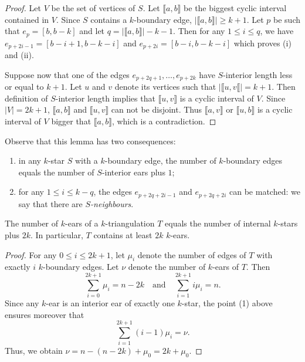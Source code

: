 \documentclass[12pt]{amsart}
\begin{document}
\begin{proof}
Let $V$ be the set of vertices of $S$. Let $\llbracket a,b\rrbracket$ be the biggest cyclic interval contained in $V$. Since $S$ contains a $k$-boundary edge, $|\llbracket a,b\rrbracket|\ge k+1$. Let $p$ be such that $e_p=[b,b-k]$ and let $q=|\llbracket a,b\rrbracket|-k-1$.
Then for any $1\le i\le q$, we have $e_{p+2i-1}=[b-i+1,b-k-i]$ and $e_{p+2i}=[b-i,b-k-i]$ which proves (i) and (ii). 

Suppose now that one of the edges $e_{p+2q+1},\ldots,e_{p+2k}$ have $S$-interior length less or equal to $k+1$. Let $u$ and $v$ denote its vertices such that $|\llbracket u,v\llbracket|=k+1$. Then definition of $S$-interior length implies that $\llbracket u,v\rrbracket$ is a cyclic interval of $V$. Since $|V|=2k+1$, $\llbracket a,b\rrbracket$ and $\llbracket u,v\rrbracket$ can not be disjoint. Thus $\llbracket a,v\rrbracket$ or $\llbracket u,b\rrbracket$ is a cyclic interval of $V$ bigger that $\llbracket a,b\rrbracket$, which is a contradiction.
\end{proof}

Observe that this lemma has two consequences:
\begin{enumerate}
\item in any $k$-star $S$ with a $k$-boundary edge, the number of $k$-boundary edges equals the number of $S$-interior ears plus $1$;
\item for any $1\le i\le k-q$, the edges $e_{p+2q+2i-1}$ and $e_{p+2q+2i}$ can be matched: we say that there are \emph{$S$-neighbours}.
\end{enumerate}

\begin{corollary}\label{earsenumeration}
The number of $k$-ears of a $k$-triangulation $T$ equals the number of internal $k$-stars plus $2k$.
In particular, $T$ contains at least $2k$ $k$-ears.
\end{corollary}

\begin{proof}
For any $0\le i\le 2k+1$, let $\mu_i$ denote the number of edges of $T$ with exactly $i$ $k$-boundary edges. Let $\nu$ denote the number of $k$-ears of $T$. Then
$$\sum_{i=0}^{2k+1} \mu_i=n-2k \quad \mathrm{and}\quad \sum_{i=1}^{2k+1} i\mu_i=n.$$
Since any $k$-ear is an interior ear of exactly one $k$-star, the point (1) above ensures moreover that
$$\sum_{i=1}^{2k+1} (i-1)\mu_i=\nu.$$
Thus, we obtain $\nu=n-(n-2k)+\mu_0=2k+\mu_0$.
\end{proof}
\end{document}
